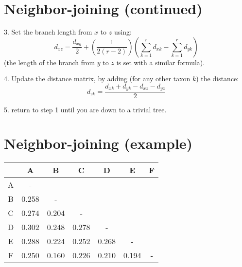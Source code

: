 \documentclass[landscape]{foils}
\begin{document}
\myNewSlide
\section*{Neighbor-joining (continued)}
\begin{compactitem}
	\item[3.] Set the branch length from $x$ to $z$ using:
	\[d_{xz} = \frac{d_{xy}}{2} + \left(\frac{1}{2(r-2)}\right)\left(\sum_{k=1}^r d_{xk}-\sum_{k=1}^r d_{yk}\right)\]
	(the length of the branch from $y$ to $z$ is set with a similar formula).
	\item[4.] Update the distance matrix, by adding (for any other taxon $k$) the distance:
	\[d_{zk} = \frac{d_{xk} + d_{yk} - d_{xz} - d_{yz}}{2}\]
	\item[5.] return to step 1 until you are down to a trivial tree.
\end{compactitem}




\myNewSlide
\section*{Neighbor-joining (example)}
\begin{table}[htdp]
\begin{center}
\begin{tabular}{|c|c|c|c|c|c|c|}
\hline
 & A & B & C & D & E & F  \\ 
\hline
A &      - &         &         &       & & \\ 
B & 0.258 &        - &         &       & & \\ 
C  & 0.274 &  0.204   &      - &       & & \\ 
D  & 0.302  & 0.248 & 0.278  &       -  & &\\
E  &  0.288  &  0.224 &  0.252 &  0.268 &        -  & \\
F  &  0.250  &  0.160 &  0.226 &  0.210 &  0.194 &        - \\
\hline
\end{tabular}
\end{center}
\end{table}

\myNewSlide
\end{document}
